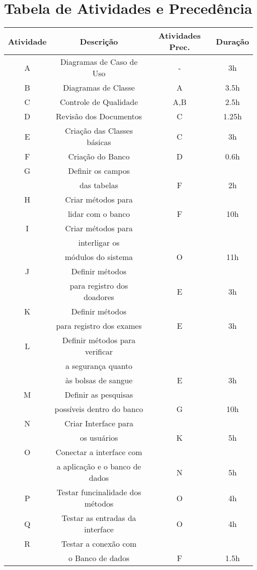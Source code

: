 \documentclass[12pt,a4paper,final]{report}
\begin{document}
\section*{Tabela de Atividades e Precedência}
\begin{center}
\begin{tabular}{|c|c|c|c|}
\hline 
Atividade & Descrição & Atividades Prec. & Duração \\ 
\hline 
A & Diagramas de Caso de Uso & - & 3h \\ 
\hline 
B & Diagramas de Classe & A & 3.5h \\ 
\hline 
C & Controle de Qualidade & A,B & 2.5h \\ 
\hline 
D & Revisão dos Documentos & C & 1.25h \\
\hline 
E & Criação das Classes básicas & C & 3h \\
\hline 
F & Criação do Banco & D & 0.6h \\ 
\hline 
G & Definir os campos & & \\ & das tabelas & F & 2h \\ 
\hline 
H & Criar métodos para & & \\ & lidar com o banco & F & 10h \\
\hline 
I & Criar métodos para & & \\ & interligar os & & \\ & módulos do sistema & O & 11h \\
\hline 
J & Definir métodos & & \\ & para registro dos doadores & E & 3h \\ 
\hline 
K & Definir métodos & & \\ & para registro dos exames & E &  3h \\ 
\hline 
L & Definir métodos para verificar & & \\ & a segurança quanto & & \\ & às bolsas de sangue & E & 3h \\ 
\hline 
M & Definir as pesquisas  & & \\ & possíveis dentro do banco & G & 10h \\ 
\hline 
N & Criar Interface para & & \\ & os usuários & K & 5h \\ 
\hline 
O & Conectar a interface com & & \\ & a aplicação e o banco de dados & N & 5h \\ 
\hline 
P & Testar funcinalidade dos métodos & O & 4h \\ 
\hline 
Q & Testar as entradas da interface & O & 4h \\ 
\hline 
R & Testar a conexão com & & \\ & o Banco de dados & F & 1.5h \\ 
\hline 
\end{tabular} 
\end{center}
\end{document}
